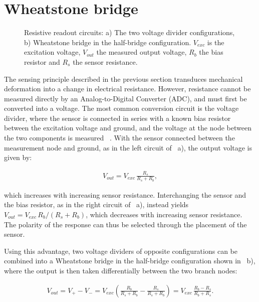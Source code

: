 \pagebreak
\section{Wheatstone bridge} \label{sec:Wheatstone_theory}

\begin{figure}[!b]
\centering

    \caption{Resistive readout circuits: a) The two voltage divider configurations, b) Wheatstone bridge in the half-bridge configuration. $V_{exc}$ is the excitation voltage, $V_{out}$ the measured output voltage, $R_b$ the bias resistor and $R_s$ the sensor resistance.}
    \label{fig:Wheatstone}
\end{figure}

The sensing principle described in the previous section transduces mechanical deformation into a change in electrical resistance. However, resistance cannot be measured directly by an Analog-to-Digital Converter (ADC), and must first be converted into a voltage. The most common conversion circuit is the voltage divider, where the sensor is connected in series with a known bias resistor between the excitation voltage and ground, and the voltage at the node between the two components is measured ~\cite{metal_gauge}.
With the sensor connected between the measurement node and ground, as in the left circuit of ~a), the output voltage is given by:

\begin{align} \label{eq:divider}
    V_{out}=V_{exc}\,\frac{R_s}{R_s+R_b},
\end{align}

which increases with increasing sensor resistance. Interchanging the sensor and the bias resistor, as in the right circuit of ~a), instead yields $V_{out}=V_{exc}\,R_b/\left(R_s+R_b\right)$, which decreases with increasing sensor resistance. The polarity of the response can thus be selected through the placement of the sensor.

Using this advantage, two voltage dividers of opposite configurations can be combined into a Wheatstone bridge in the half-bridge configuration shown in ~b), where the output is then taken differentially between the two branch nodes:

\begin{align} \label{eq:bridge}
    V_{out}=V_{+}-V_{-}=V_{exc}\left(\frac{R_b}{R_s+R_b}-\frac{R_s}{R_s+R_b}\right)=V_{exc}\,\frac{R_b-R_s}{R_b+R_s}.
\end{align}

